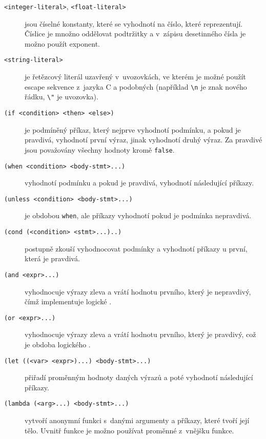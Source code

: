 \begin{description}
  \item[\texttt{<integer-literal>}, \texttt{<float-literal>}] jsou číselné
    konstanty, které se vyhodnotí na číslo, které reprezentují. Číslice je
    množno oddělovat podtržitky a v~zápisu desetinného čísla je možno použít
    exponent.

  \item[\texttt{<string-literal>}] je řetězcový literál uzavřený v~uvozovkách,
    ve kterém je možné použít escape sekvence z~jazyka C a podobných
    (například \texttt{\textbackslash{}n} je znak nového řádku,
    \texttt{\textbackslash{}"} je uvozovka).

  \item[\texttt{(if <condition> <then> <else>)}] je podmíněný příkaz, který
    nejprve vyhodnotí podmínku, a pokud je pravdivá, vyhodnotí první výraz,
    jinak vyhodnotí druhý výraz. Za pravdivé jsou považovány všechny hodnoty
    kromě \texttt{false}.

  \item[\texttt{(when <condition> <body-stmt>...)}] vyhodnotí podmínku a pokud
    je pravdivá, vyhodnotí následující příkazy. 

  \item[\texttt{(unless <condition> <body-stmt>...)}] je obdobou \texttt{when},
    ale příkazy vyhodnotí pokud je podmínka nepravdivá.

  \item[\texttt{(cond (<condition> <stmt>...)..)}] postupně zkouší vyhodnocovat
    podmínky a vyhodnotí příkazy u první, která je pravdivá.

  \item[\texttt{(and <expr>...)}] vyhodnocuje výrazy zleva a vrátí hodnotu
    prvního, který je nepravdivý, čímž implementuje logické .

  \item[\texttt{(or <expr>...)}] vyhodnocuje výrazy zleva a vrátí hodnotu
    prvního, který je pravdivý, což je obdoba logického .

  \item[\texttt{(let ((<var> <expr>)...) <body-stmt>...)}] přiřadí proměnným
    hodnoty daných výrazů a poté vyhodnotí následující příkazy.

  \item[\texttt{(lambda (<arg>...) <body-stmt>...)}] vytvoří anonymní funkci
    s~danými argumenty a příkazy, které tvoří její tělo. Uvnitř funkce je možno
    používat proměnné z~vnějšku funkce.


\end{description}
